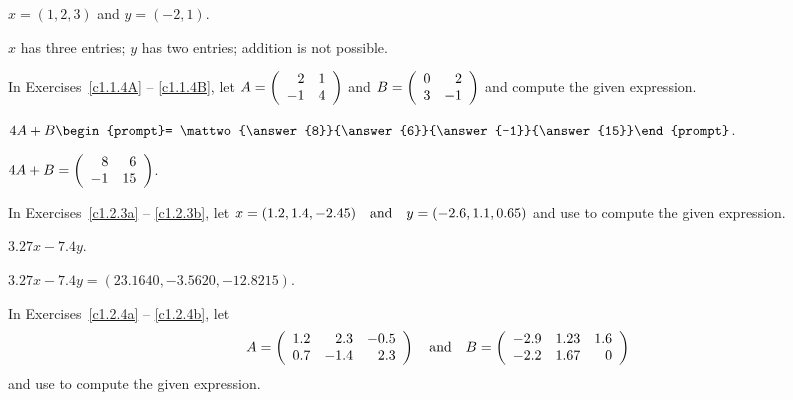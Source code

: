\documentclass{article}
\begin{document}
\begin{exercise}\label{c1.1.3c}
  $x=(1,2,3)$ and $y=(-2,1)$.
  

\begin{solution}
\ans $x$ has three entries; $y$ has two entries; addition is not possible.

\end{solution}
\end{exercise}





\problemlabel

\noindent In Exercises~\ref{c1.1.4A} -- \ref{c1.1.4B}, let
$A=\left(\begin{array}{rr} 2 & 1\\ -1 &4\end{array}\right)$ and $B=\left(\begin{array}{rr} 0 & 2\\ 3 &-1\end{array}\right)$ and compute the given 
expression.


\begin{exercise}\label{c1.1.4A}
  $4A+B\begin{prompt}= \mattwo{\answer{8}}{\answer{6}}{\answer{-1}}{\answer{15}}\end{prompt}$.

\begin{solution}
\ans $4A + B = \left(\begin{array}{rr} 8 & 6\\ -1 &15\end{array}\right)$.


\end{solution}
\end{exercise}





\matlabproblemlabel

\noindent In Exercises~\ref{c1.2.3a} -- \ref{c1.2.3b}, let 
$x=(1.2,1.4,-2.45) \quad\mbox{and}\quad y=(-2.6,1.1,0.65)$ and use \Matlab to compute the 
given expression.


\begin{computerExercise}  \label{c1.2.3a}
$3.27x-7.4y$.

\begin{solution}
\ans $3.27x - 7.4y = (23.1640, -3.5620, -12.8215)$.

\end{solution}
\end{computerExercise}





\matlabproblemlabel

\noindent In Exercises~\ref{c1.2.4a} -- \ref{c1.2.4b}, let 
\[
A = \left(\begin{array}{rrr} 1.2 & 2.3 & -0.5\\ 0.7 & -1.4 & 2.3
\end{array}\right) \quad\mbox{and}\quad
B = \left(\begin{array}{rrr} -2.9 & 1.23 & 1.6\\ -2.2 & 1.67 & 0
\end{array}\right)
\]
and use \Matlab to compute the given expression.
\end{document}
